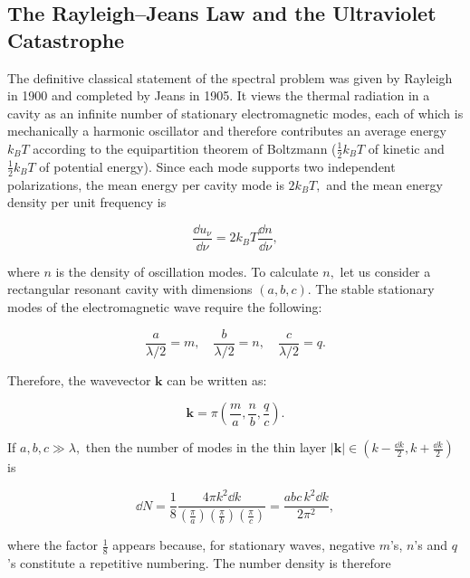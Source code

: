 \subsection{The Rayleigh--Jeans Law and the Ultraviolet Catastrophe}
The definitive classical statement of the spectral problem was given by Rayleigh in 1900 and completed by Jeans in 1905. It views the thermal radiation in a cavity as an infinite number of stationary electromagnetic modes, each of which is mechanically a harmonic oscillator and therefore contributes an average energy $k_BT$ according to the equipartition theorem of Boltzmann ($\tfrac12k_BT$ of kinetic and $\tfrac12k_BT$ of potential energy). Since each mode supports two independent polarizations, the mean energy per cavity mode is $2k_BT,$ and the mean energy density per unit frequency is
\begin{linenomath}
    \begin{equation}
        \frac{\dd u_\nu}{\dd \nu} = 2k_BT \frac{\dd n}{\dd \nu},
    \end{equation}
\end{linenomath}
where $n$ is the density of oscillation modes. To calculate $n,$ let us consider a rectangular resonant cavity with dimensions $(a,b,c).$ The stable stationary modes of the electromagnetic wave require the following:
\begin{linenomath}
    \begin{equation}
        \dfrac{a}{\lambda/2} = m,\quad \dfrac{b}{\lambda/2} = n, \quad \dfrac{c}{\lambda/2} = q.
    \end{equation}
\end{linenomath}
Therefore, the wavevector $\bm{k}$ can be written as:
\begin{linenomath}
    \begin{equation}
        \bm{k} = \pi\left( \frac{m}{a}, \frac{n}{b}, \frac{q}{c} \right).
    \end{equation}
\end{linenomath}
If $a,b,c \gg \lambda,$ then the number of modes in the thin layer $|\bm{k}|\in \left( k-\frac{\dd k}{2}, k+ \frac{\dd k}{2} \right)$ is
\begin{linenomath}
    \begin{equation}
        \dd N = \frac18 \frac{4\pi k^2 \dd k}{(\frac{\pi}{a})(\frac{\pi}{b})(\frac{\pi}{c})} = \frac{abc\, k^2 \dd k}{2\pi^2},
    \end{equation}
\end{linenomath}
where the factor $\frac18$ appears because, for stationary waves, negative $m$'s, $n$'s and $q$'s constitute a repetitive numbering. The number density is therefore

